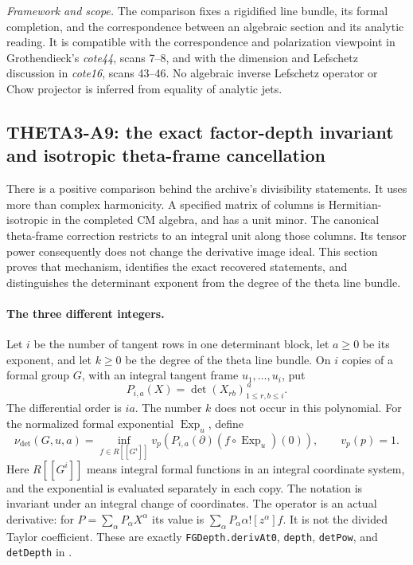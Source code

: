\documentclass[11pt]{article}
\newcommand{\framework}[1]{\par\smallskip\noindent\textit{Framework and scope.} #1\par}
\theoremstyle{definition}\newtheorem{definition}[theorem]{Definition}\newtheorem{remark}[theorem]{Remark}
\begin{document}
\framework{The comparison fixes a rigidified line bundle, its
formal completion, and the correspondence between an algebraic
section and its analytic reading.  It is compatible with the
correspondence and polarization viewpoint in Grothendieck's
\emph{cote44}, scans 7--8, and with the dimension and Lefschetz
discussion in \emph{cote16}, scans 43--46.  No algebraic inverse
Lefschetz operator or Chow projector is inferred from equality of
analytic jets.}


\subsection{THETA3-A9: the exact factor-depth invariant and isotropic theta-frame cancellation}\label{A9}

There is a positive comparison behind the archive's divisibility
statements.  It uses more than complex harmonicity.  A specified
matrix of columns is Hermitian-isotropic in the completed CM
algebra, and has a unit minor.  The canonical theta-frame
correction restricts to an integral unit along those columns.
Its tensor power consequently does not change the derivative
image ideal.  This section proves that mechanism, identifies
the exact recovered statements, and distinguishes the
determinant exponent from the degree of the theta line bundle.

\paragraph{The three different integers.}
Let $i$ be the number of tangent rows in one determinant block,
let $a\geq0$ be its exponent, and let $k\geq0$ be the degree of
the theta line bundle.  On $i$ copies of a formal group $G$,
with an integral tangent frame $u_1,\ldots,u_i$, put
\[
 P_{i,a}(X)=\det(X_{rb})_{1\leq r,b\leq i}^{\,a}.
 \tag{A9a}
\]
The differential order is $ia$.  The number $k$ does not occur
in this polynomial.  For the normalized formal exponential
$\operatorname{Exp}_u$, define
\[
 \nu_{\det}(G,u,a)
   =\inf_{f\in R[[G^i]]}
       v_p\!\left(
         P_{i,a}(\partial)
            (f\circ\operatorname{Exp}_u)(0)\right),
 \qquad v_p(p)=1 .
 \tag{A9b}
\]
Here $R[[G^i]]$ means integral formal functions in an integral
coordinate system, and the exponential is evaluated separately
in each copy.  The notation is invariant under an integral
change of coordinates.  The operator is an actual derivative:
for $P=\sum_\alpha P_\alpha X^\alpha$ its value is
$\sum_\alpha P_\alpha\alpha![z^\alpha]f$.
It is not the divided Taylor coefficient.  These are exactly
\texttt{FGDepth.derivAt0}, \texttt{depth}, \texttt{detPow}, and
\texttt{detDepth} in
.
\end{document}
